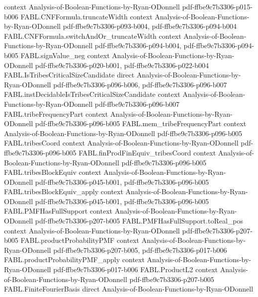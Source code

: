 \begin{theorem}
  {context}
  {Analysis-of-Boolean-Functions-by-Ryan-ODonnell}
  {pdf-ffbe9c7b3306-p015-b006}
\proofstep
  {FABL.CNFFormula.truncateWidth}
  {context}
  {Analysis-of-Boolean-Functions-by-Ryan-ODonnell}
  {pdf-ffbe9c7b3306-p093-b004,
    pdf-ffbe9c7b3306-p094-b004}
\proofstep
  {FABL.CNFFormula.switchAndOr_truncateWidth}
  {context}
  {Analysis-of-Boolean-Functions-by-Ryan-ODonnell}
  {pdf-ffbe9c7b3306-p094-b004,
    pdf-ffbe9c7b3306-p094-b005}
\proofstep
  {FABL.signValue_neg}
  {context}
  {Analysis-of-Boolean-Functions-by-Ryan-ODonnell}
  {pdf-ffbe9c7b3306-p020-b001,
    pdf-ffbe9c7b3306-p022-b004}
\proofstep
  {FABL.IsTribesCriticalSizeCandidate}
  {direct}
  {Analysis-of-Boolean-Functions-by-Ryan-ODonnell}
  {pdf-ffbe9c7b3306-p096-b006,
    pdf-ffbe9c7b3306-p096-b007}
\proofstep
  {FABL.instDecidableIsTribesCriticalSizeCandidate}
  {context}
  {Analysis-of-Boolean-Functions-by-Ryan-ODonnell}
  {pdf-ffbe9c7b3306-p096-b007}
\proofstep
  {FABL.tribeFrequencyPart}
  {context}
  {Analysis-of-Boolean-Functions-by-Ryan-ODonnell}
  {pdf-ffbe9c7b3306-p096-b005}
\proofstep
  {FABL.mem_tribeFrequencyPart}
  {context}
  {Analysis-of-Boolean-Functions-by-Ryan-ODonnell}
  {pdf-ffbe9c7b3306-p096-b005}
\proofstep
  {FABL.tribesCoord}
  {context}
  {Analysis-of-Boolean-Functions-by-Ryan-ODonnell}
  {pdf-ffbe9c7b3306-p096-b005}
\proofstep
  {FABL.finProdFinEquiv_tribesCoord}
  {context}
  {Analysis-of-Boolean-Functions-by-Ryan-ODonnell}
  {pdf-ffbe9c7b3306-p096-b005}
\proofstep
  {FABL.tribesBlockEquiv}
  {context}
  {Analysis-of-Boolean-Functions-by-Ryan-ODonnell}
  {pdf-ffbe9c7b3306-p045-b001,
    pdf-ffbe9c7b3306-p096-b005}
\proofstep
  {FABL.tribesBlockEquiv_apply}
  {context}
  {Analysis-of-Boolean-Functions-by-Ryan-ODonnell}
  {pdf-ffbe9c7b3306-p045-b001,
    pdf-ffbe9c7b3306-p096-b005}
\proofstep
  {FABL.PMFHasFullSupport}
  {context}
  {Analysis-of-Boolean-Functions-by-Ryan-ODonnell}
  {pdf-ffbe9c7b3306-p207-b005}
\proofstep
  {FABL.PMFHasFullSupport.toReal_pos}
  {context}
  {Analysis-of-Boolean-Functions-by-Ryan-ODonnell}
  {pdf-ffbe9c7b3306-p207-b005}
\proofstep
  {FABL.productProbabilityPMF}
  {context}
  {Analysis-of-Boolean-Functions-by-Ryan-ODonnell}
  {pdf-ffbe9c7b3306-p207-b005,
    pdf-ffbe9c7b3306-p017-b006}
\proofstep
  {FABL.productProbabilityPMF_apply}
  {context}
  {Analysis-of-Boolean-Functions-by-Ryan-ODonnell}
  {pdf-ffbe9c7b3306-p017-b006}
\proofstep
  {FABL.ProductL2}
  {context}
  {Analysis-of-Boolean-Functions-by-Ryan-ODonnell}
  {pdf-ffbe9c7b3306-p207-b005}
\proofstep
  {FABL.FiniteFourierBasis}
  {direct}
  {Analysis-of-Boolean-Functions-by-Ryan-ODonnell}

\end{theorem}
